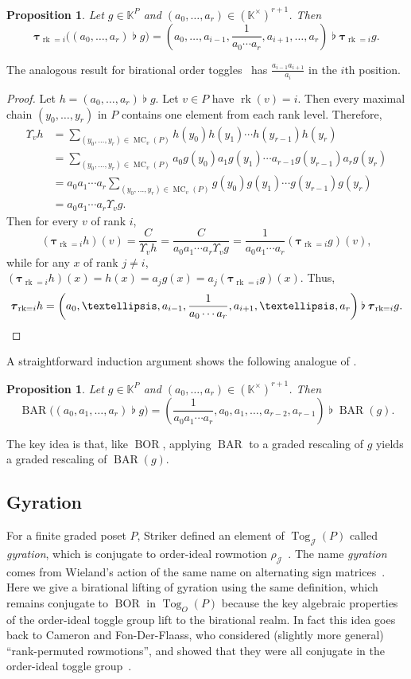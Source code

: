 \documentclass[10pt]{amsart}
\newtheorem{prop}[theo]{Proposition}
\theoremstyle{definition}
\newcommand{\kk}{\mathbb{K}}
\DeclareMathOperator{\tog}{Tog}
\DeclareMathOperator{\mc}{MC}
\DeclareMathOperator{\rk}{rk}
\DeclareMathOperator{\BAR}{BAR}
\DeclareMathOperator{\BOR}{BOR}
\newcommand{\rktau}[1]{\boldsymbol{\tau}_{\rk=#1}}
\newcommand{\flatbin}{\mathbin{\flat}}
\newcommand{\calj}{\mathcal{J}}
\newcommand\rowm{\rho}
\newcommand\rowJ{\rowm_{\mathcal{J}}}
\newcommand{\ds}{}
\begin{document}
\begin{prop}\label{prop:rank-tog-graded-rescaling}
Let $g\in\kk^P$ and $(a_0,\dots,a_r)\in(\kk^\times)^{r+1}$.
Then
\[
\rktau{i}\big( (a_0,\dots,a_r)\flatbin g \big)=
\left( a_0,\dots,a_{i-1},\frac{1}{a_0\cdots a_r},a_{i+1},\dots,a_r \right) \flatbin\rktau{i}g.
\]
\end{prop}
The analogous result for birational order toggles~\cite[Prop.~39]{GrRo16} has 
$\ds \frac{a_{i-1}a_{i+1}}{a_{i}}$ in the $i$th position. 
\begin{proof}
Let $h=(a_0,\dots,a_r)\flatbin g$. Let $v\in P$ have $\rk(v)=i$. Then every maximal chain
$(y_0,\dots,y_r)$ in $P$ contains one element from each rank level. Therefore, 
\begin{align*}
\Upsilon_v h &= \sum\limits_{(y_0,\dots,y_r)\in\mc_v(P)} h(y_0)h(y_1)\cdots h(y_{r-1}) h(y_r)\\
&= \sum\limits_{(y_0,\dots,y_r)\in\mc_v(P)} a_0 g(y_0) a_1 g(y_1)\cdots a_{r-1} g(y_{r-1}) a_r g(y_r)\\
&= a_0a_1\cdots a_r \sum\limits_{(y_0,\dots,y_r)\in\mc_v(P)} g(y_0) g(y_1)\cdots g(y_{r-1}) g(y_r)\\
&= a_0a_1\cdots a_r \Upsilon_v g.
\end{align*}
Then for every $v$ of rank $i$,
\[
(\rktau{i}h)(v)=\frac{C}{\Upsilon_v h}=\frac{C}{a_0a_1\cdots a_r \Upsilon_v g}
=\frac{1}{a_0a_1\cdots a_r}(\rktau{i}g)(v),
\] 
while for any $x$ of rank $j\not=i$,
$(\rktau{i}h)(x)=h(x)=a_j g(x) = a_j (\rktau{i}g)(x)$.
Thus, 
\[
\rktau{i}h = \left( a_0,\dots,a_{i-1},\frac{1}{a_0\cdots a_r},a_{i+1},\dots,a_r \right) \flatbin \rktau{i}g.\qedhere
\]
\end{proof}
A straightforward induction argument shows the following analogue of
\cite[Prop.~40]{GrRo16}. 
\begin{prop}\label{prop:BAR-graded-rescaling}
Let $g\in\kk^P$ and $(a_0,\dots,a_r)\in(\kk^\times)^{r+1}$.
Then
\[
\BAR\big( (a_0,a_1, \dots,a_r)\flatbin g \big)=
\left( \frac{1}{a_0 a_1\cdots a_r}, a_0, a_1, \dots, a_{r-2}, a_{r-1} \right) \flatbin\BAR(g).
\]
\end{prop}

The key idea is that, like $\BOR$, applying $\BAR$ to a graded rescaling of $g$ yields a graded
rescaling of $\BAR(g)$. 

\subsection{Gyration}

For a finite graded poset $P$, Striker defined an
element of $\tog_\calj(P)$ called \emph{gyration},
which is conjugate to order-ideal rowmotion
$\rowJ$~\cite[\S~6]{strikerRS}.
The name \emph{gyration} comes from Wieland's action of the same name on alternating sign matrices~\cite{wieland}. 
Here we give a birational lifting of gyration using the
same definition, which remains conjugate to
$\BOR$ in $\tog_O(P)$ because the key algebraic properties of the order-ideal toggle group lift
to the birational realm. In fact this idea goes back to Cameron and Fon-Der-Flaass,
who considered (slightly more general) ``rank-permuted rowmotions'', and showed that they
were all conjugate in the order-ideal toggle group~\cite[Lemma 2]{cameronfonder}.
\end{document}
